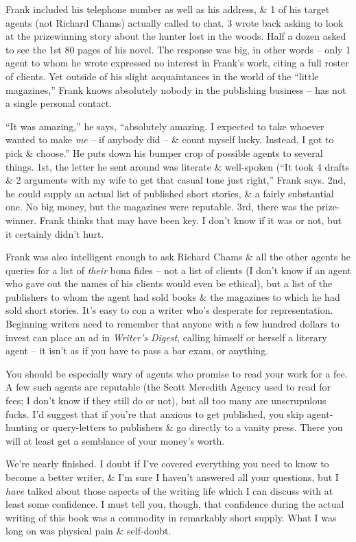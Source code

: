 \documentclass{article}
\numberwithin{equation}{section}
\begin{document}
Frank included his telephone number as well as his address, \& 1 of his target agents (not Richard Chams) actually called to chat. 3 wrote back asking to look at the prizewinning story about the hunter lost in the woods. Half a dozen asked to see the 1st 80 pages of his novel. The response was big, in other words -- only 1 agent to whom he wrote expressed no interest in Frank's work, citing a full roster of clients. Yet outside of his slight acquaintances in the world of the ``little magazines,'' Frank knows absolutely nobody in the publishing business -- has not a single personal contact.

``It was amazing,'' he says, ``absolutely amazing. I expected to take whoever wanted to make \textit{me} -- if anybody did -- \& count myself lucky. Instead, I got to pick \& choose.'' He puts down his bumper crop of possible agents to several things. 1st, the letter he sent around was literate \& well-spoken (``It took 4 drafts \& 2 arguments with my wife to get that casual tone just right,'' Frank says. 2nd, he could supply an actual list of published short stories, \& a fairly substantial one. No big money, but the magazines were reputable. 3rd, there was the prize-winner. Frank thinks that may have been key. I don't know if it was or not, but it certainly didn't hurt.

Frank was also intelligent enough to ask Richard Chams \& all the other agents he queries for a list of \textit{their} bona fides -- not a list of clients (I don't know if an agent who gave out the names of his clients would even be ethical), but a list of the publishers to whom the agent had sold books \& the magazines to which he had sold short stories. It's easy to con a writer who's desperate for representation. Beginning writers need to remember that anyone with a few hundred dollars to invest can place an ad in \textit{Writer's Digest}, calling himself or herself a literary agent -- it isn't as if you have to pass a bar exam, or anything.

You should be especially wary of agents who promise to read your work for a fee. A few such agents are reputable (the Scott Meredith Agency used to read for fees; I don't know if they still do or not), but all too many are unscrupulous fucks. I'd  suggest that if you're that anxious to get published, you skip agent-hunting or query-letters to publishers \& go directly to a vanity press. There you will at least get a semblance of your money's worth.

 We're nearly finished. I doubt if I've covered everything you need to know to become a better writer, \& I'm sure I haven't answered all your questions, but I \textit{have} talked about those aspects of the writing life which I can discuss with at least some confidence. I must tell you, though, that confidence during the actual writing of this book was a commodity in remarkably short supply. What I was long on was physical pain \& self-doubt.
\end{document}
